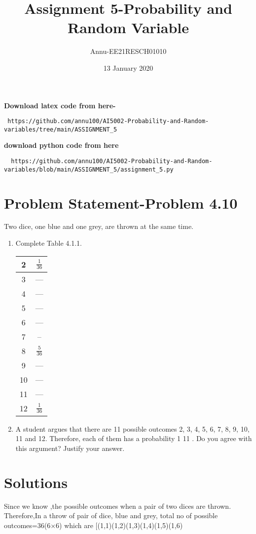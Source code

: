 \documentclass[journel,12pt,twocoloums]{IEEEtran}
\title{Assignment 5-Probability and Random Variable}
\author{Annu-EE21RESCH01010}
\date{13 January 2020}
\begin{document}
 \maketitle
\textbf{Download latex code from here-}\\
\begin{lstlisting}
 https://github.com/annu100/AI5002-Probability-and-Random-variables/tree/main/ASSIGNMENT_5
 \end{lstlisting}
 \textbf{download python code from here}\\
 \begin{lstlisting}
  https://github.com/annu100/AI5002-Probability-and-Random-variables/blob/main/ASSIGNMENT_5/assignment_5.py
 \end{lstlisting}
 \section{Problem Statement-Problem 4.10}
Two dice, one blue and one grey, are thrown
at the same time.
\begin{enumerate}
\item
Complete Table 4.1.1.
\begin{center}
    \begin{tabular}{|c|c|}
    \hline
    2 & $\frac{1}{36}$\\
    \hline
    3 & --- \\
    \hline
    4 & --- \\
    \hline
    5 & --- \\
    \hline
    6 & --- \\
    \hline
    7 & -- \\
    \hline
    8 & $\frac{5}{36}$ \\
    \hline
    9 & --- \\
    \hline
    10 & --- \\
    \hline
    11 & --- \\
    \hline
    12 & $\frac{1}{36}$ \\
    \hline
    \end{tabular}
\end{center}
\item
A student argues that there are 11 possible
outcomes 2, 3, 4, 5, 6, 7, 8, 9, 10, 11 and
12. Therefore, each of them has a probability
1
11 . Do you agree with this argument? Justify
your answer.
\end{enumerate}
\section{Solutions}
Since we know ,the possible outcomes when a pair of two dices are thrown.
Therefore,In a throw of pair of dice, blue and grey, total no of possible outcomes=36(6×6) which are
[(1,1)(1,2)(1,3)(1,4)(1,5)(1,6) \\
\end{document}

